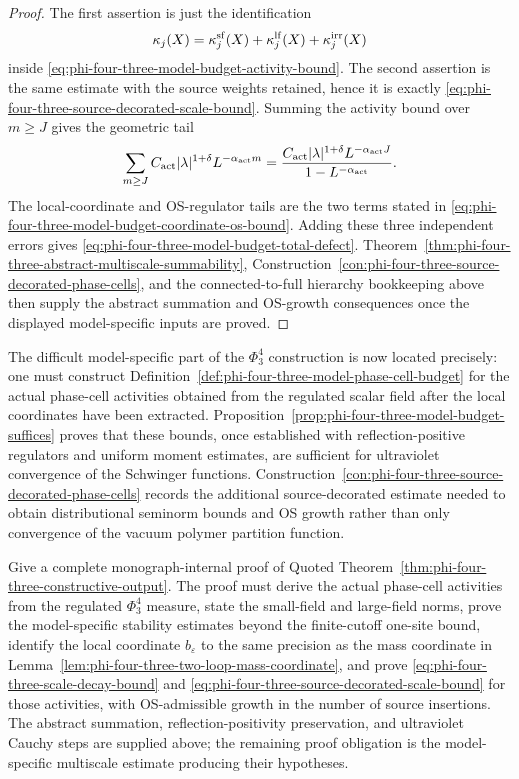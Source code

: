 \begin{proof}
The first assertion is just the identification
\[
  \kappa_j(X)
  =
  \kappa_j^{\rm sf}(X)+\kappa_j^{\rm lf}(X)+\kappa_j^{\rm irr}(X)
\]
inside \eqref{eq:phi-four-three-model-budget-activity-bound}.  The second
assertion is the same estimate with the source weights retained, hence it is
exactly \eqref{eq:phi-four-three-source-decorated-scale-bound}.  Summing the
activity bound over \(m\geq J\) gives the geometric tail
\[
  \sum_{m\geq J}
  C_{\rm act}|\lambda|^{1+\delta}L^{-\alpha_{\rm act}m}
  =
  \frac{C_{\rm act}|\lambda|^{1+\delta}L^{-\alpha_{\rm act}J}}
       {1-L^{-\alpha_{\rm act}}}.
\]
The local-coordinate and OS-regulator tails are the two terms stated in
\eqref{eq:phi-four-three-model-budget-coordinate-os-bound}.  Adding these
three independent errors gives
\eqref{eq:phi-four-three-model-budget-total-defect}.
Theorem~\ref{thm:phi-four-three-abstract-multiscale-summability},
Construction~\ref{con:phi-four-three-source-decorated-phase-cells}, and the
connected-to-full hierarchy bookkeeping above then supply the abstract
summation and OS-growth consequences once the displayed model-specific
inputs are proved.
\end{proof}

The difficult model-specific part of the \(\Phi^4_3\) construction is now
located precisely: one must construct
Definition~\ref{def:phi-four-three-model-phase-cell-budget} for the actual
phase-cell activities obtained from the regulated scalar field after the
local coordinates have been extracted.
Proposition~\ref{prop:phi-four-three-model-budget-suffices} proves that these bounds,
once established with reflection-positive regulators and uniform moment
estimates, are sufficient for ultraviolet convergence of the Schwinger
functions.  Construction~\ref{con:phi-four-three-source-decorated-phase-cells}
records the additional
source-decorated estimate needed to obtain distributional seminorm bounds
and OS growth rather than only convergence of the vacuum polymer partition
function.

\begin{openproblem}
\label{op:self-contained-phi-four-three-proof}
Give a complete monograph-internal proof of
Quoted Theorem~\ref{thm:phi-four-three-constructive-output}.  The proof must
derive the actual phase-cell activities from the regulated \(\Phi^4_3\)
measure, state the small-field and large-field norms, prove the
model-specific stability estimates beyond the finite-cutoff one-site bound,
identify the local coordinate \(b_\varepsilon\) to the same precision as the
mass coordinate in Lemma~\ref{lem:phi-four-three-two-loop-mass-coordinate},
and prove
\eqref{eq:phi-four-three-scale-decay-bound} and
\eqref{eq:phi-four-three-source-decorated-scale-bound} for those
activities, with OS-admissible growth in the number of source insertions.
The abstract summation, reflection-positivity preservation, and ultraviolet
Cauchy steps are supplied above; the remaining proof obligation is the
model-specific multiscale estimate producing their hypotheses.
\end{openproblem}

